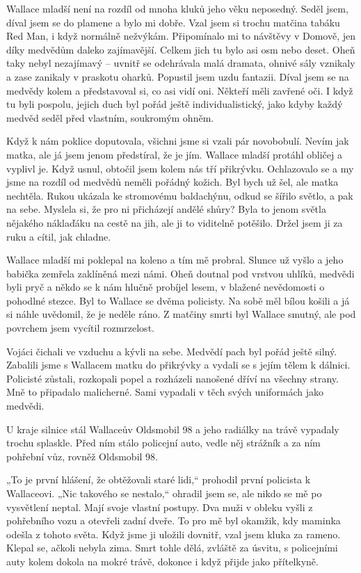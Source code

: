 Wallace mladší není na rozdíl od mnoha kluků jeho věku neposedný. Seděl jsem, díval jsem se do plamene a bylo mi dobře. Vzal jsem si trochu matčina tabáku Red Man, i když normálně nežvýkám. Připomínalo mi to návštěvy v Domově, jen díky medvědům daleko zajímavější. Celkem jich tu bylo asi osm nebo deset. Oheň taky nebyl nezajímavý – uvnitř se odehrávala malá dramata, ohnivé sály vznikaly a zase zanikaly v praskotu oharků. Popustil jsem uzdu fantazii. Díval jsem se na medvědy kolem a představoval si, co asi vidí oni. Někteří měli zavřené oči. I když tu byli pospolu, jejich duch byl pořád ještě individualistický, jako kdyby každý medvěd seděl před vlastním, soukromým ohněm.

Když k nám poklice doputovala, všichni jsme si vzali pár novobobulí. Nevím jak matka, ale já jsem jenom předstíral, že je jím. Wallace mladší protáhl obličej a vyplivl je. Když usnul, obtočil jsem kolem nás tří přikrývku. Ochlazovalo se a my jsme na rozdíl od medvědů neměli pořádný kožich. Byl bych už šel, ale matka nechtěla. Rukou ukázala ke stromovému baldachýnu, odkud se šířilo světlo, a pak na sebe. Myslela si, že pro ni přicházejí andělé shůry? Byla to jenom světla nějakého náklaďáku na cestě na jih, ale ji to viditelně potěšilo. Držel jsem ji za ruku a cítil, jak chladne.

\bigskip

Wallace mladší mi poklepal na koleno a tím mě probral. Slunce už vyšlo a jeho babička zemřela zaklíněná mezi námi. Oheň doutnal pod vrstvou uhlíků, medvědi byli pryč a někdo se k nám hlučně probíjel lesem, v blažené nevědomosti o pohodlné stezce. Byl to Wallace se dvěma policisty. Na sobě měl bílou košili a já si náhle uvědomil, že je neděle ráno. Z matčiny smrti byl Wallace smutný, ale pod povrchem jsem vycítil rozmrzelost.

Vojáci čichali ve vzduchu a kývli na sebe. Medvědí pach byl pořád ještě silný. Zabalili jsme s Wallacem matku do přikrývky a vydali se s jejím tělem k dálnici. Policisté zůstali, rozkopali popel a rozházeli nanošené dříví na všechny strany. Mně to připadalo malicherné. Sami vypadali v těch svých uniformách jako medvědi.

U kraje silnice stál Wallaceův Oldsmobil 98 a jeho radiálky na trávě vypadaly trochu splaskle. Před ním stálo policejní auto, vedle něj strážník a za ním pohřební vůz, rovněž Oldsmobil 98.

„To je první hlášení, že obtěžovali staré lidi,“ prohodil první policista k Wallaceovi. „Nic takového se nestalo,“ ohradil jsem se, ale nikdo se mě po vysvětlení neptal. Mají svoje vlastní postupy. Dva muži v obleku vyšli z pohřebního vozu a otevřeli zadní dveře. To pro mě byl okamžik, kdy maminka odešla z tohoto světa. Když jsme ji uložili dovnitř, vzal jsem kluka za rameno. Klepal se, ačkoli nebyla zima. Smrt tohle dělá, zvláště za úsvitu, s policejními auty kolem dokola na mokré trávě, dokonce i když přijde jako přítelkyně.


